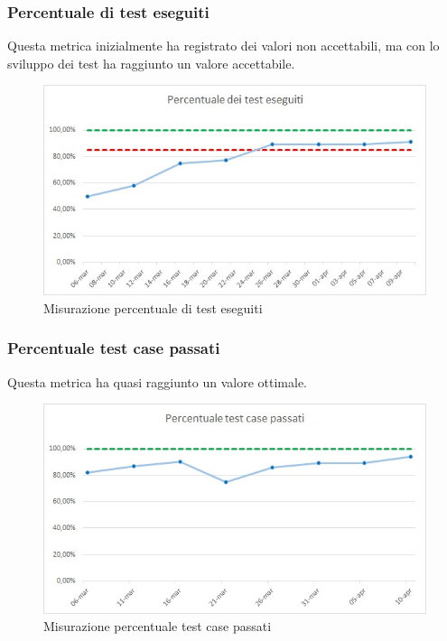 \subsubsection{Percentuale di test eseguiti}
Questa metrica inizialmente ha registrato dei valori non accettabili, ma con lo sviluppo dei test ha raggiunto un valore accettabile.
\begin{figure} [H]
	\centering
	\includegraphics[scale=1]{Img/testEs}
	\caption{Misurazione percentuale di test eseguiti}\label{}
\end{figure}

\subsubsection{Percentuale test case passati}
Questa metrica ha quasi raggiunto un valore ottimale.
\begin{figure} [H]
	\centering
	\includegraphics[scale=1]{Img/testPas}
	\caption{Misurazione percentuale test case passati}\label{}
\end{figure}


